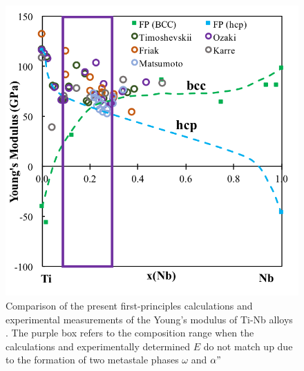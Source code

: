 \newpage
\begin{figure}[H]
	\centering
	\includegraphics[width=\textwidth]{Chapter-1/Figures/TiNbElastic.png}
	\caption{Comparison of the present first-principles calculations and experimental measurements of the Young's modulus of Ti-Nb alloys \cite{Timoshevskii2011,Ozaki2004,Friak2012,Karre2015,Matsumoto2006}. The purple box refers to the composition range when the calculations and experimentally determined $E$ do not match up due to the formation of two metastale phases $\omega$ and $\alpha"$}
	\label{Ch1-figure:tinbelasitc}
\end{figure}
